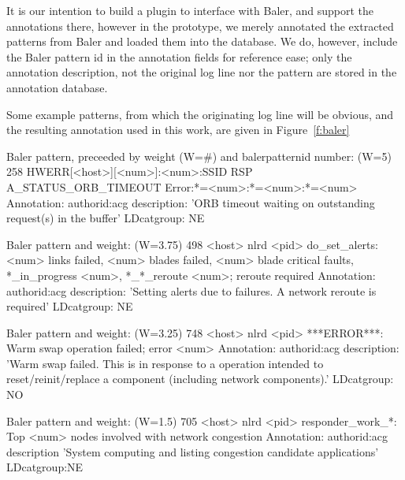 It is our intention to
build a plugin to interface with Baler, and support the annotations there,
however in the prototype, we merely annotated the extracted patterns from
Baler and loaded them into the database.
We do, however, include the Baler pattern id in the annotation fields
for reference ease; only the annotation description, not the original log line nor the pattern
are stored in the annotation database.

Some example patterns, from which the originating log line will be obvious, and
the resulting annotation used in this work, are given in Figure~\ref{f:baler}

\begin{figure*}
\begin{annol}

Baler pattern, preceeded by weight (W=#) and balerpatternid number:
(W=5)        258   HWERR[<host>][<num>]:<num>:SSID RSP A_STATUS_ORB_TIMEOUT Error:*=<num>:*=<num>:*=<num>
Annotation:
authorid:acg  description: 'ORB timeout waiting on outstanding request(s) in the buffer'  LDcatgroup: NE

Baler pattern and weight:
(W=3.75)     498   <host> nlrd <pid> do_set_alerts: <num> links failed, <num> blades failed, <num> blade critical faults, *_in_progress <num>, *_*_reroute <num>; reroute required
Annotation:
authorid:acg  description: 'Setting alerts due to failures. A network reroute is required' LDcatgroup: NE

Baler pattern and weight:
(W=3.25)     748   <host> nlrd <pid> ***ERROR***: Warm swap operation failed; error <num>
Annotation:
authorid:acg description: 'Warm swap failed. This is in response to a operation intended to reset/reinit/replace a component (including network components).' LDcatgroup: NO

Baler pattern and weight:
(W=1.5)      705   <host> nlrd <pid> responder_work_*: Top <num> nodes involved with network congestion
Annotation:
authorid:acg description 'System computing and listing congestion candidate applications' LDcatgroup:NE
\end{annol}
\caption{Example Baler patterns extracted from log lines and their annotated versions. Events to annotate are based on
knowledge of significant events. Annotation descriptions can provide additional context to non-self-explanatory log messages.}
\label{f:baler}
\end{figure*}


